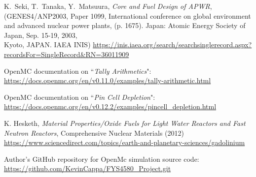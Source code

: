 \documentclass[twocolumn,a4paper,10pt]{article}
\begin{document}
\small
{}

\begin{thebibliography}{}
{}
K.~Seki, T.~Tanaka, Y.~Matsuura, \textit{Core and Fuel Design of APWR}, (GENES4/ANP2003,
Paper 1099,  International conference on global environment and advanced nuclear power plants, (p. 1675). Japan: Atomic Energy Society of Japan, Sep. 15-19, 2003,\\ Kyoto, JAPAN. IAEA INIS)
\url{https://inis.iaea.org/search/searchsinglerecord.aspx?recordsFor=SingleRecord&RN=36011909}

OpenMC documentation on ``\textit{Tally Arithmetics}":\\
\url{https://docs.openmc.org/en/v0.11.0/examples/tally-arithmetic.html}

OpenMC documentation on ``\textit{Pin Cell Depletion}":\\
\url{https://docs.openmc.org/en/v0.12.2/examples/pincell_depletion.html}

K. Hesketh, \textit{Material Properties/Oxide Fuels for Light Water Reactors and Fast Neutron Reactors}, Comprehensive Nuclear Materials (2012)\\
\url{https://www.sciencedirect.com/topics/earth-and-planetary-sciences/gadolinium}

Author's GitHub repository for OpenMc simulation source code:\\
\url{https://github.com/KevinCappa/FYS4580_Project.git}

\end{thebibliography}
\end{document}

